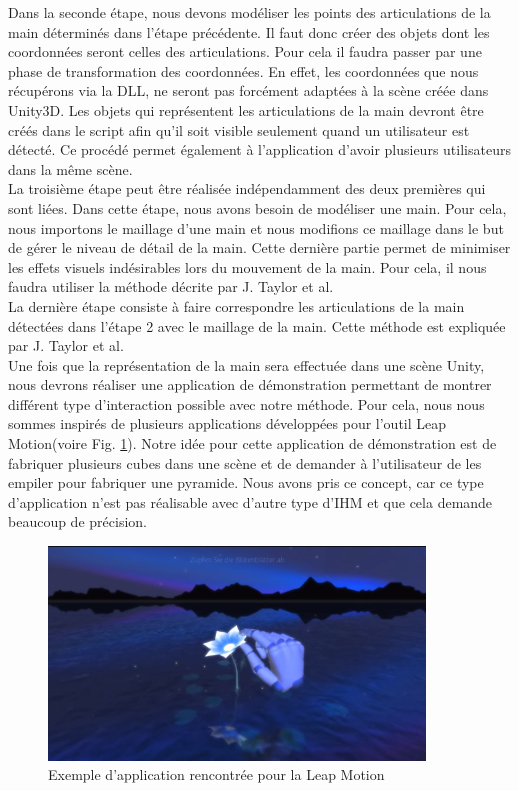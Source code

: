 Dans la seconde étape, nous devons modéliser les points des articulations de la main déterminés 
dans l'étape précédente. Il faut donc créer des objets dont les coordonnées seront celles des articulations.
Pour cela il faudra passer par une phase de transformation des coordonnées. En effet, les coordonnées
que nous récupérons via la DLL, ne seront pas forcément adaptées à la scène créée dans Unity3D. Les 
objets qui représentent les articulations de la main devront être créés dans le script afin qu'il 
soit visible seulement quand un utilisateur est détecté. Ce procédé permet également à l'application
d'avoir plusieurs utilisateurs dans la même scène.\\

La troisième étape peut être réalisée indépendamment des deux premières qui sont liées. Dans cette étape,
nous avons besoin de modéliser une main. Pour cela, nous importons le maillage d'une main et
nous modifions ce maillage dans le but de gérer le niveau de détail de la main. Cette dernière
partie permet de minimiser les effets visuels indésirables lors du mouvement de la main.
Pour cela, il nous faudra utiliser la méthode décrite par J. Taylor et al\cite{export:217428}.\\

La dernière étape consiste à faire correspondre les articulations de la main détectées dans l'étape 2 avec
le maillage de la main. Cette méthode est expliquée par J. Taylor et al\cite{export:217428}.\\

Une fois que la représentation de la main sera effectuée dans une scène Unity, nous devrons réaliser une 
application de démonstration permettant de montrer différent type d'interaction possible avec notre 
méthode. Pour cela, nous nous sommes inspirés de plusieurs applications développées pour l'outil
Leap Motion(voire Fig. \ref{fig:example}). Notre idée pour cette application de démonstration est de fabriquer plusieurs cubes dans 
une scène et de demander à l'utilisateur de les empiler pour fabriquer une pyramide. Nous avons pris
ce concept, car ce type d'application n'est pas réalisable avec d'autre type d'IHM et que cela demande
beaucoup de précision.

\begin{figure}
  \begin{center}
    \includegraphics[width=10cm]{images/exampleHand.png}
    \caption{Exemple d'application rencontrée pour la Leap Motion}
    \label{fig:example}
  \end{center}
\end{figure}

